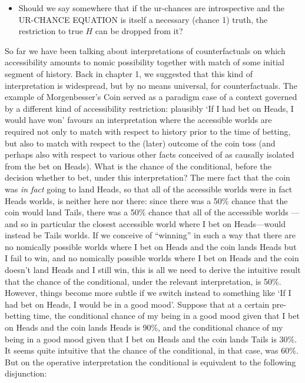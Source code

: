 \documentclass[leqno, 11pt, a5paper, openany]{article}
\begin{document}
\begin{itemize}
\item
  Should we say somewhere that if the ur-chances are introspective and
  the UR-CHANCE EQUATION is itself a necessary (chance 1) truth, the
  restriction to true $H$ can be dropped from it?
\end{itemize}

So far we have been talking about interpretations of counterfactuals on which accessibility amounts to nomic possibility together with match of some initial segment of history. Back in chapter 1, we suggested that this kind of interpretation is widespread, but by no means universal, for counterfactuals. The example of Morgenbesser's Coin served as a paradigm case of a context governed by a different kind of accessibility restriction: plausibly ‘If I had bet on Heads, I would have won’ favours an interpretation where the accessible worlds are required not only to match with respect to history prior to the time of betting, but also to match with respect to the (later) outcome of the coin toss (and perhaps also with respect to various other facts conceived of as causally isolated from the bet on Heads). What is the chance of the conditional, before the decision whether to bet, under this interpretation? The mere fact that the coin was \emph{in fact} going to land Heads, so that all of the accessible worlds were in fact Heads worlds, is neither here nor there: since there was a 50\% chance that the coin would land Tails, there was a 50\% chance that all of the accessible worlds ---and so in particular the closest accessible world where I bet on Heads---would instead be Tails worlds. If we conceive of “winning” in such a way that there are no nomically possible worlds where I bet on Heads and the coin lands Heads but I fail to win, and no nomically possible worlds where I bet on Heads and the coin doesn't land Heads and I still win, this is all we need to derive the intuitive result that the chance of the conditional, under the relevant interpretation, is 50\%. However, things become more subtle if we switch instead to something like ‘If I had bet on Heads, I would be in a good mood’. Suppose that at a certain pre-betting time, the conditional chance of my being in a good mood given that I bet on Heads and the coin lands Heads is 90\%, and the conditional chance of my being in a good mood given that I bet on Heads and the coin lands Tails is 30\%. It seems quite intuitive that the chance of the conditional, in that case, was 60\%. But on the operative interpretation the conditional is equivalent to the following disjunction:
\end{document}
